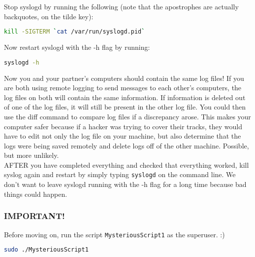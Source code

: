 \documentclass{article}
\begin{document}
\begin{enumerate}
Stop syslogd by running the following (note that the apostrophes are actually backquotes, on the tilde key):

\begin{lstlisting}[basicstyle=\ttfamily, backgroundcolor = \color{lightgray}, language = bash, xleftmargin = 0cm, framexleftmargin = 1em]
kill -SIGTERM `cat /var/run/syslogd.pid`
\end{lstlisting}

Now restart syslogd with the -h flag by running:

\begin{lstlisting}[basicstyle=\ttfamily, backgroundcolor = \color{lightgray}, language = bash, xleftmargin = 0cm, framexleftmargin = 1em]
syslogd -h
\end{lstlisting}

\end{enumerate}

Now you and your partner's computers should contain the same log files! If you are both using remote logging to send messages to each other's computers, the log files on both will contain the same information. If information is deleted out of one of the log files, it will still be present in the other log file. You could then use the diff command to compare log files if a discrepancy arose. This makes your computer safer because if a hacker was trying to cover their tracks, they would have to edit not only the log file on your machine, but also determine that the logs were being saved remotely and delete logs off of the other machine. Possible, but more unlikely. \\

AFTER you have completed everything and checked that everything worked, kill syslog again and restart by simply typing \verb|syslogd| on the command line. We don't want to leave syslogd running with the -h flag for a long time because bad things could happen. \\

\subsubsection*{IMPORTANT!}

Before moving on, run the script \verb|MysteriousScript1| as the superuser. :)

\begin{lstlisting}[basicstyle=\ttfamily, backgroundcolor = \color{lightgray}, language = bash, xleftmargin = 0cm, framexleftmargin = 1em]
sudo ./MysteriousScript1
\end{lstlisting}
\end{document}
